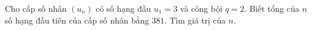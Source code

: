 \begin{ex}
Cho cấp số nhân $(u_n)$ có số hạng đầu $u_1=3$ và công bội $q=2$. Biết tổng của $n$ số hạng đầu tiên của cấp số nhân bằng $381$. Tìm giá trị của $n$.
\end{ex}
